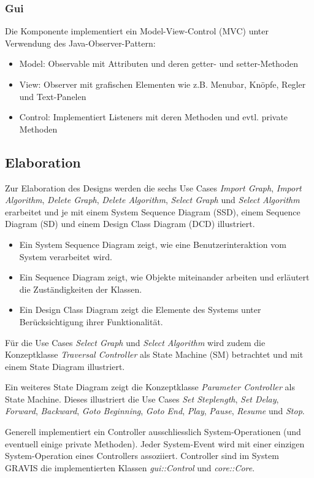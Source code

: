 \subsubsection{Gui}
\label{subsubsec:Gui}
Die Komponente implementiert ein Model-View-Control (MVC) unter Verwendung des Java-Observer-Pattern:
\begin{itemize}
  \item Model: Observable mit Attributen und deren getter- und setter-Methoden
  \item View: Observer mit grafischen Elementen wie z.B. Menubar, Kn\"opfe, Regler und Text-Panelen
  \item Control: Implementiert Listeners mit deren Methoden und evtl. private Methoden
\end{itemize}
% 
\subsection{Elaboration}
\label{subsec:Elaboration}
Zur Elaboration des Designs werden die sechs Use Cases \textit{Import Graph}, \textit{Import Algorithm}, \textit{Delete Graph}, \textit{Delete Algorithm}, \textit{Select Graph} und \textit{Select Algorithm} erarbeitet und je mit einem System Sequence Diagram (SSD), einem Sequence Diagram (SD) und einem Design Class Diagram (DCD) illustriert.
\begin{itemize}
  \item Ein System Sequence Diagram zeigt, wie eine Benutzerinteraktion vom System verarbeitet wird.
  \item Ein Sequence Diagram zeigt, wie Objekte miteinander arbeiten und erl\"autert die Zust\"andigkeiten der Klassen. 
  \item Ein Design Class Diagram zeigt die Elemente des Systems unter Ber\"ucksichtigung ihrer Funktionalit\"at.
\end{itemize}

F\"ur die Use Cases \textit{Select Graph} und \textit{Select Algorithm} wird zudem die Konzeptklasse \textit{Traversal Controller} als State Machine (SM) betrachtet und mit einem State Diagram illustriert.

Ein weiteres State Diagram zeigt die Konzeptklasse \textit{Parameter Controller} als State Machine. Dieses illustriert die Use Cases \textit{Set Steplength}, \textit{Set Delay}, \textit{Forward}, \textit{Backward}, \textit{Goto Beginning}, \textit{Goto End}, \textit{Play}, \textit{Pause}, \textit{Resume} und \textit{Stop}.

Generell implementiert ein Controller ausschliesslich System-Operationen (und eventuell einige private Methoden). Jeder System-Event wird mit einer einzigen System-Operation eines Controllers assoziiert. Controller sind im System GRAVIS die implementierten Klassen \textit{gui::Control} und \textit{core::Core}.
% 
